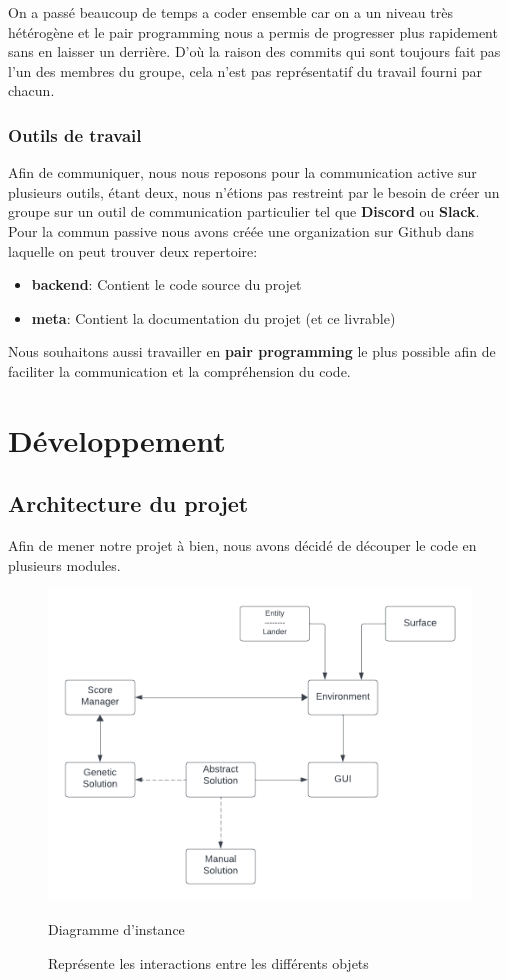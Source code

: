 \documentclass[french,a4paper,10pt,twocolumn]{article}
\begin{document}
On a passé beaucoup de temps a coder ensemble car on a un niveau très hétérogène et le pair programming nous a permis de progresser plus rapidement sans en laisser 
un derrière. D'où la raison des commits qui sont toujours fait pas l'un des membres du groupe, cela n'est pas représentatif du travail fourni par chacun.

\subsubsection{Outils de travail}

Afin de communiquer, nous nous reposons pour la communication active sur plusieurs outils, étant deux,
nous n'étions pas restreint par le besoin de créer un groupe sur un outil de communication particulier tel que \textbf{Discord} ou \textbf{Slack}.
Pour la commun passive nous avons créée une organization sur Github dans laquelle on peut trouver deux repertoire:
\begin{itemize}
    \item \textbf{backend}: Contient le code source du projet
    \item \textbf{meta}: Contient la documentation du projet (et ce livrable)
\end{itemize}

Nous souhaitons aussi travailler en \textbf{pair programming} le plus possible afin de faciliter la communication et la compréhension du code.


\section{Développement}

\subsection{Architecture du projet}

Afin de mener notre projet à bien, nous avons décidé de découper le code en plusieurs modules.
\begin{figure}[H]
    \centering
    \includegraphics[scale=0.5]{images/class_diagram.png}
    \caption{Diagramme d'instance}\label{fig:architecture}
    \captionsetup{justification=centering, font=small}
    \caption*{Représente les interactions entre les différents objets}
\end{figure}
\end{document}
